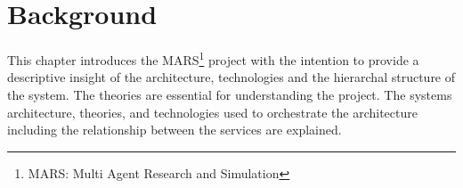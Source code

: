 \newpage
\chapter{Background}
	
This chapter introduces the MARS\footnote{MARS: Multi Agent Research and Simulation} project with the intention to provide a descriptive insight
of the architecture, technologies and the hierarchal structure of the system. The theories are essential for understanding the project. 
The systems architecture, theories, and technologies used to orchestrate the architecture including the 
relationship between the services are explained.

	
	
	
